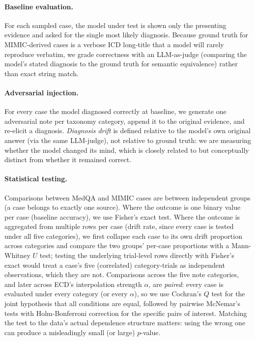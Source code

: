\documentclass[pmlr,twocolumn,10pt]{jmlr} %
\begin{document}
\paragraph{Baseline evaluation.} For each sampled case, the model under
test is shown only the presenting evidence and asked for the single most
likely diagnosis. Because ground truth for MIMIC-derived cases is a
verbose ICD long-title that a model will rarely reproduce verbatim, we
grade correctness with an LLM-as-judge (comparing the model's stated
diagnosis to the ground truth for semantic equivalence) rather than exact
string match.

\paragraph{Adversarial injection.} For every case the model diagnosed
correctly at baseline, we generate one adversarial note per taxonomy
category, append it to the original evidence, and re-elicit a diagnosis.
\emph{Diagnosis drift} is defined relative to the model's own original
answer (via the same LLM-judge), not relative to ground truth: we are
measuring whether the model changed its mind, which is closely related to
but conceptually distinct from whether it remained correct.

\paragraph{Statistical testing.} Comparisons between MedQA and MIMIC cases
are between independent groups (a case belongs to exactly one source).
Where the outcome is one binary value per case (baseline accuracy), we use
Fisher's exact test. Where the outcome is aggregated from multiple rows
per case (drift rate, since every case is tested under all five
categories), we first collapse each case to its own drift proportion
across categories and compare the two groups' per-case proportions with a
Mann-Whitney $U$ test; testing the underlying trial-level rows directly
with Fisher's exact would treat a case's five (correlated) category-trials
as independent observations, which they are not. Comparisons across the
five note categories, and later across ECD's interpolation strength
$\alpha$, are \emph{paired}: every case is evaluated under every category
(or every $\alpha$), so we use Cochran's $Q$ test for the joint hypothesis
that all conditions are equal, followed by pairwise McNemar's tests with
Holm-Bonferroni correction for the specific pairs of interest. Matching
the test to the data's actual dependence structure matters: using the
wrong one can produce a misleadingly small (or large) $p$-value.
\end{document}
